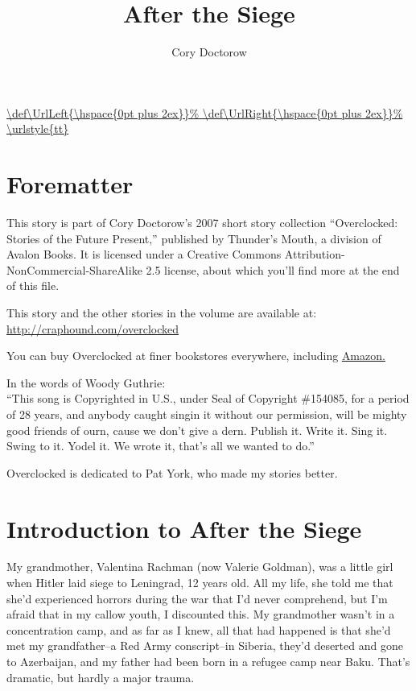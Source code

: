\newcommand{\heading}{\chapter*}
\renewcommand{\dash}{\discretionary{}{}{}--}

\usepackage{url}
\DeclareUrlCommand\url{\def\UrlLeft{\hspace{0pt plus 2ex}}%
        \def\UrlRight{\hspace{0pt plus 2ex}}%
        \urlstyle{tt}}




\setlength{\emergencystretch}{1ex}

\title{After the Siege}
\author{Cory Doctorow}
\date{}
\maketitle

\heading{Forematter}
\begin{flushleft}
\setlength{\parskip}{0.7\baselineskip plus 0.3\baselineskip}
This story is part of Cory Doctorow’s 2007 short story collection
“Overclocked: Stories of the Future Present,” published by
Thunder’s Mouth, a division of Avalon Books. It is licensed under a
Creative Commons Attribution-NonCommercial-ShareAlike 2.5 license,
about which you’ll find more at the end of this file.

This story and the other stories in the volume are available at:
\url{http://craphound.com/overclocked}

You can buy Overclocked at finer bookstores everywhere, including
\href{http://www.amazon.com/exec/obidos/ASIN/1560259817/downandoutint-20}{Amazon.}

In the words of Woody Guthrie:\\
“This song is Copyrighted in U.S., under Seal of Copyright
\#154085, for a period of 28 years, and anybody caught singin it
without our permission, will be mighty good friends of ourn, cause
we don’t give a dern. Publish it. Write it. Sing it. Swing to it.
Yodel it. We wrote it, that’s all we wanted to do.”

Overclocked is dedicated to Pat York, who made my stories better.
\end{flushleft}

\heading{Introduction to After the Siege}

My grandmother, Valentina Rachman (now Valerie Goldman), was a
little girl when Hitler laid siege to Leningrad, 12 years old. All
my life, she told me that she’d experienced horrors during the war
that I’d never comprehend, but I’m afraid that in my callow youth,
I discounted this. My grandmother wasn’t in a concentration camp,
and as far as I knew, all that had happened is that she’d met my
grandfather\dash{}a Red Army conscript\dash{}in Siberia, they’d deserted and
gone to Azerbaijan, and my father had been born in a refugee camp
near Baku. That’s dramatic, but hardly a major trauma.

